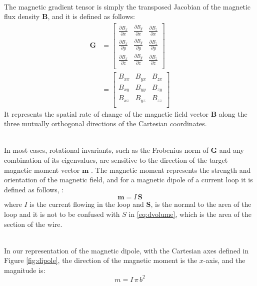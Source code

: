 \documentclass[main]{subfiles}
\begin{document}
\noindent\\
The magnetic gradient tensor is simply the transposed Jacobian of the magnetic flux density $\mathbf{B}$, and it is defined
as follows:
\begin{equation}
\begin{aligned}
\mathbf{G} &= 
\begin{bmatrix}
 \frac{\partial B_x}{\partial x} & \frac{\partial B_y}{\partial x} & \frac{\partial B_z}{\partial x}\\
 \frac{\partial B_x}{\partial y} & \frac{\partial B_y}{\partial y} & \frac{\partial B_z}{\partial y}\\
 \frac{\partial B_x}{\partial z} & \frac{\partial B_y}{\partial z} & \frac{\partial B_z}{\partial z}\\
\end{bmatrix}
\\
&=
\begin{bmatrix}
 B_{xx} & B_{yx} & B_{zx}\\
 B_{xy} & B_{yy} & B_{zy}\\
 B_{xz} & B_{yz} & B_{zz}\\
\end{bmatrix}
\end{aligned}
\label{eq:Jacobian}
\end{equation}
It represents the spatial rate of change of the magnetic field vector $\mathbf{B}$
along the three mutually orthogonal directions of the Cartesian coordinates.

\noindent\\
In most cases, rotational invariants,
such as the Frobenius norm of $\mathbf{G}$ and any combination of its
eigenvalues, are sensitive to the direction of the target magnetic
moment vector $\mathbf{m}$ \cite{NSS_single_localization}. The magnetic moment represents the strength 
and orientation of the magnetic field, and for a magnetic dipole of a current
loop it is defined as follows, \cite{book-magnetism}:
\begin{equation}
 \mathbf{m} = I \, \mathbf{S}
\end{equation}
where $I$ is the current flowing in the loop and $\mathbf{S}$, is the normal to the area of the loop
and it is not to be confused with $S$ in \ref{eq:dvolume}, which is the area
of the section of the wire.

\noindent\\
In our representation of the magnetic dipole, with the Cartesian axes
defined in Figure \ref{fig:dipole}, the direction of the magnetic moment is the $x$-axis,
and the magnitude is:
\begin{equation}
 m = I \, \pi \, b^2
    \label{eq:magnetic_moment}  
\end{equation}
\end{document}
